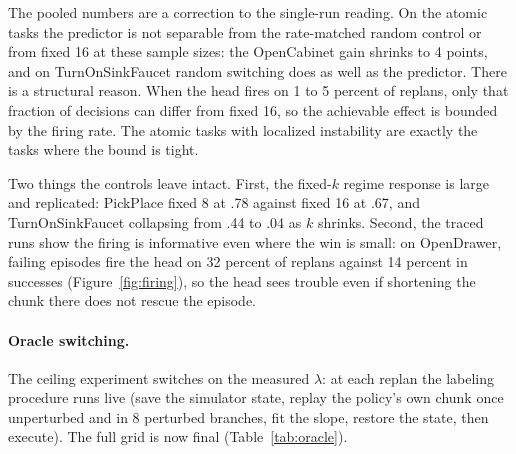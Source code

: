 \documentclass[11pt]{article}
\begin{document}
The pooled numbers are a correction to the single-run reading. On the atomic
tasks the predictor is not separable from the rate-matched random control or
from fixed 16 at these sample sizes: the OpenCabinet gain shrinks to 4
points, and on TurnOnSinkFaucet random switching does as well as the
predictor. There is a structural reason. When the head fires on 1 to 5
percent of replans, only that fraction of decisions can differ from fixed 16,
so the achievable effect is bounded by the firing rate. The atomic tasks with
localized instability are exactly the tasks where the bound is tight.

Two things the controls leave intact. First, the fixed-$k$ regime response is
large and replicated: PickPlace fixed 8 at .78 against fixed 16 at .67, and
TurnOnSinkFaucet collapsing from .44 to .04 as $k$ shrinks. Second, the
traced runs show the firing is informative even where the win is small: on
OpenDrawer, failing episodes fire the head on 32 percent of replans against
14 percent in successes (Figure~\ref{fig:firing}), so the head sees trouble
even if shortening the chunk there does not rescue the episode.

\paragraph{Oracle switching.}
The ceiling experiment switches on the measured $\lambda$: at each replan the
labeling procedure runs live (save the simulator state, replay the policy's
own chunk once unperturbed and in 8 perturbed branches, fit the slope,
restore the state, then execute). The full grid is now final
(Table~\ref{tab:oracle}).
\end{document}
